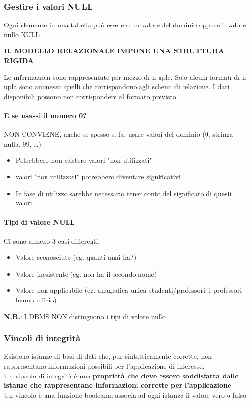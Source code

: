 \documentclass[12pt,a4paper]{article}
\begin{document}
\subsubsection{Gestire i valori NULL}
Ogni elemento in una tabella può essere o un valore del dominio oppure il valore nullo NULL
\begin{center}\textbf{IL MODELLO RELAZIONALE IMPONE UNA STRUTTURA RIGIDA} \end{center}
Le informazioni sono rappresentate per mezzo di n-uple. Solo alcuni formati di n-upla sono ammessi: quelli che corrispondono agli schemi di relazione. I dati disponibili possono non corrispondere al formato previsto

\paragraph{E se usassi il numero 0?\\}
NON CONVIENE, anche se spesso si fa, usare valori del dominio (0, stringa nulla, 99, \dots)
\begin{itemize}
\item Potrebbero non esistere valori "non utilizzati"
\item valori "non utilizzati" potrebbero diventare significativi
\item In fase di utilizzo sarebbe necessario tener conto del significato di questi valori
\end{itemize}

\paragraph{Tipi di valore NULL\\}
Ci sono almeno 3 casi differenti:
\begin{itemize}
\item Valore sconosciuto (eg. quanti anni ha?)
\item Valore inesistente (eg. non ha il secondo nome)
\item Valore non applicabile (eg. anagrafica unica studenti/professori, i professori hanno ufficio)
\end{itemize}
\textbf{N.B.}: I DBMS NON distinguono i tipi di valore nullo

\subsubsection{Vincoli di integrità}
Esistono istanze di basi di dati che, pur sintatticamente corrette, non rappresentano informazioni possibili per l’applicazione di interesse.\\
Un vincolo di integrità è una \textbf{proprietà che deve essere soddisfatta dalle istanze che rappresentano informazioni corrette per l'applicazione}\\
Un vincolo è una funzione booleana: associa ad ogni istanza il valore vero o falso
\end{document}
